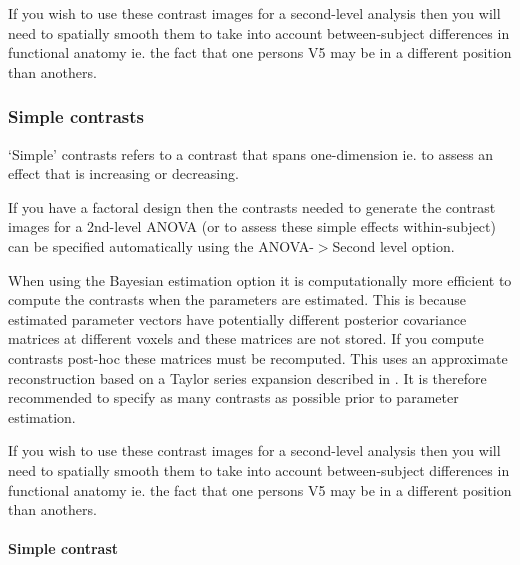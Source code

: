 \documentclass[a4paper,titlepage]{book}
\begin{document}
                                                                                                            

If you wish to use these contrast images for a second-level analysis then you will need to spatially smooth them to take into account between-subject differences in functional anatomy ie. the fact that one persons V5 may be in a different position than anothers. 


\subsubsection{Simple contrasts}
`Simple' contrasts refers to a contrast that spans one-dimension ie. to assess an effect that is increasing or decreasing.

                                                                                                            

If you have a factoral design then the contrasts needed to generate the contrast images for a 2nd-level ANOVA (or to assess these simple effects within-subject) can be specified automatically using the ANOVA-$>$Second level option.

                                                                                                            

When using the Bayesian estimation option it is computationally more efficient to compute the contrasts when the parameters are estimated. This is because estimated parameter vectors have potentially different posterior covariance matrices at different voxels and these matrices are not stored. If you compute contrasts post-hoc these matrices must be recomputed. This uses an approximate reconstruction based on a Taylor series expansion described in \cite{vb3}. It is therefore recommended to specify as many contrasts as possible prior to parameter estimation.

                                                                                                            

If you wish to use these contrast images for a second-level analysis then you will need to spatially smooth them to take into account between-subject differences in functional anatomy ie. the fact that one persons V5 may be in a different position than anothers. 


\paragraph{Simple contrast}
\end{document}
